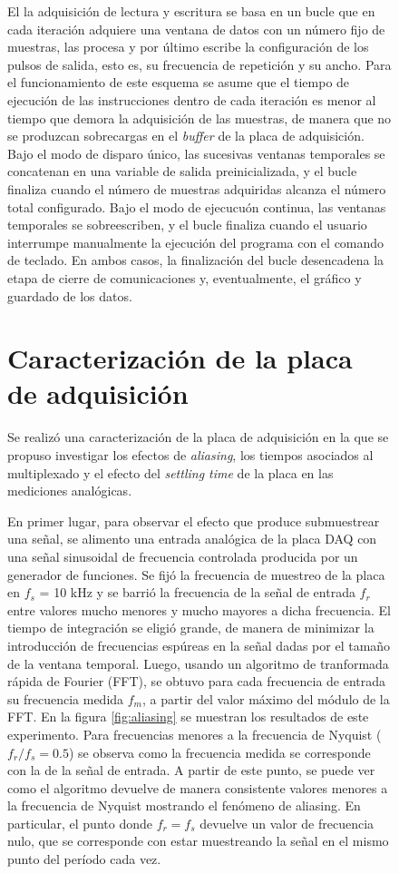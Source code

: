 \documentclass[a4paper,11pt]{article}
\begin{document}
\begin{figure}[!ht]
	
	El la adquisición de lectura y escritura se basa en un bucle que en cada iteración adquiere una ventana de datos con un número fijo de muestras, las procesa y por último escribe la configuración de los pulsos de salida, esto es, su frecuencia de repetición y su ancho. Para el funcionamiento de este esquema se asume que el tiempo de ejecución de las instrucciones dentro de cada iteración es menor al tiempo que demora la adquisición de las muestras, de manera que no se produzcan sobrecargas en el \emph{buffer} de la placa de adquisición. Bajo el modo de disparo único, las sucesivas ventanas temporales se concatenan en una variable de salida preinicializada, y el bucle finaliza cuando el número de muestras adquiridas alcanza el número total configurado. Bajo el modo de ejecucuón continua, las ventanas temporales se sobreescriben, y el bucle finaliza cuando el usuario interrumpe manualmente la ejecución del programa con el comando de teclado. En ambos casos, la finalización del bucle desencadena la etapa de cierre de comunicaciones y, eventualmente, el gráfico y guardado de los datos.	

\section{Caracterización de la placa de adquisición}

Se realizó una caracterización de la placa de adquisición en la que se propuso investigar los efectos de \textit{aliasing}, los tiempos asociados al multiplexado y el efecto del \textit{settling time} de la placa en las mediciones analógicas. 

En primer lugar, para observar el efecto que produce submuestrear una señal, se alimento una entrada analógica de la placa DAQ con una señal sinusoidal de frecuencia controlada producida por un generador de funciones. Se fijó la frecuencia de muestreo de la placa en $f_s$ = 10 kHz y se barrió la frecuencia de la señal de entrada $f_r$ entre valores mucho menores y mucho mayores a dicha frecuencia. El tiempo de integración se eligió grande, de manera de minimizar la introducción de frecuencias espúreas en la señal dadas por el tamaño de la ventana temporal. Luego, usando un algoritmo de tranformada rápida de Fourier (FFT), se obtuvo para cada frecuencia de entrada su frecuencia medida $f_m$, a partir del valor máximo del módulo de la FFT. En la figura \ref{fig:aliasing} se muestran los resultados de este experimento. Para frecuencias menores a la frecuencia de Nyquist ($f_r/f_s = 0.5$) se observa como la frecuencia medida se corresponde con la de la señal de entrada. A partir de este punto, se puede ver como el algoritmo devuelve de manera consistente valores menores a la frecuencia de Nyquist mostrando el fenómeno de aliasing. En particular, el punto donde $f_r = f_s$ devuelve un valor de frecuencia nulo, que se corresponde con estar muestreando la señal en el mismo punto del período cada vez.


\end{figure}
\end{document}
